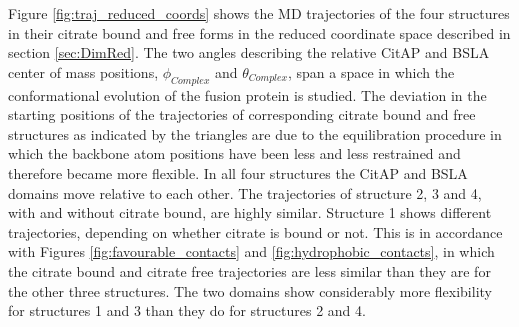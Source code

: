 \documentclass[english, a4paper, 12pt, titlepage, draft]{article}
\begin{document}
Figure \ref{fig:traj_reduced_coords} shows the MD trajectories of the four structures in their citrate bound and free forms in the reduced coordinate space described in section \ref{sec:DimRed}.
The two angles describing the relative CitAP and BSLA center of mass positions, $\phi_{Complex}$ and $\theta_{Complex}$, span a space in which the conformational evolution of the fusion protein is studied.
The deviation in the starting positions of the trajectories of corresponding citrate bound and free structures as indicated by the triangles are due to the equilibration procedure in which the backbone atom positions have been less and less restrained and therefore became more flexible.
In all four structures the CitAP and BSLA domains move relative to each other.
The trajectories of structure 2, 3 and 4, with and without citrate bound, are highly similar.
Structure 1 shows different trajectories, depending on whether citrate is bound or not.
This is in accordance with Figures \ref{fig:favourable_contacts} and \ref{fig:hydrophobic_contacts}, in which the citrate bound and citrate free trajectories are less similar than they are for the other three structures.
The two domains show considerably more flexibility for structures 1 and 3 than they do for structures 2 and 4.
\end{document}
